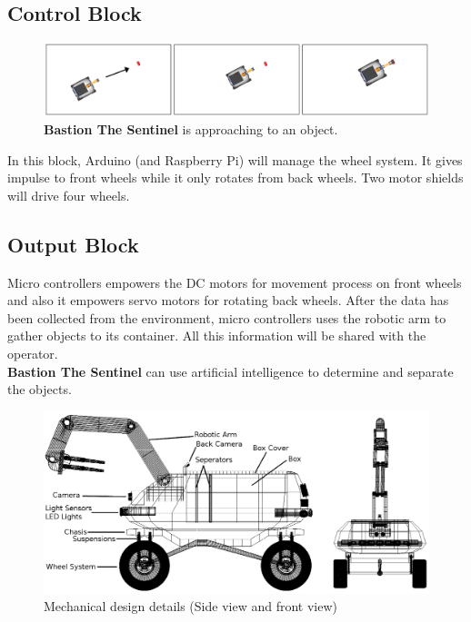 \documentclass[12pt,a4paper]{article}
\begin{document}
   \subsection{Control Block}
    \begin{flushleft}
     \begin{figure}[h!]
      \begin{center}
       \includegraphics[scale=0.3]{3frame}
       \caption{\textbf{Bastion The Sentinel} is approaching to an object.}
      \end{center}
     \end{figure}
     In this block, Arduino (and Raspberry Pi) will manage the wheel system. It gives impulse to front wheels while it only 
     rotates from back wheels. Two motor shields will drive four wheels.
    \end{flushleft}

   \subsection{Output Block}
    \begin{flushleft}
     Micro controllers empowers the DC motors for movement process on front wheels and also it empowers servo motors for 
     rotating back wheels. After the data has been collected from the environment, micro controllers uses the robotic arm 
     to gather objects to its container. All this information will be shared with the operator.\\
     \textbf{Bastion The Sentinel} can use artificial intelligence to determine and separate the objects.\\
     \bigskip
     \begin{figure}[h]
      \begin{center}
       \includegraphics[scale=0.4]{skeleton_detailed}
       \caption{Mechanical design details (Side view and front view)}
      \end{center}
     \end{figure}
     \bigskip
    \end{flushleft}
\end{document}
